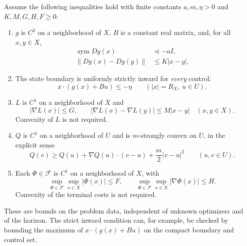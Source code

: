 \documentclass[11pt,a4paper]{article}
\newcommand{\sym}{\operatorname{sym}}
\begin{document}
Assume the following inequalities hold with finite constants
$a,m,\eta>0$ and $K,M,G,H,F\geq0$:
\begin{enumerate}
\item $g$ is $C^2$ on a neighborhood of $X$, $B$ is a constant real
matrix, and, for all $x,y\in X$,
\begin{align}
 \sym Dg(x)&\preceq-aI,\label{eq:drift}\\
 \|Dg(x)-Dg(y)\|&\leq K|x-y|.\label{eq:jaclip}
\end{align}
\item The state boundary is uniformly strictly inward for \emph{every}
control:
\begin{equation}\label{eq:inward}
 x\cdot(g(x)+Bu)\leq-\eta
 \qquad (|x|=R_X,\ u\in U).
\end{equation}
\item $L$ is $C^1$ on a neighborhood of $X$ and
\begin{equation}\label{eq:statecost}
 |\nabla L(x)|\leq G,\qquad
 |\nabla L(x)-\nabla L(y)|\leq M|x-y|
 \quad(x,y\in X).
\end{equation}
Convexity of $L$ is not required.
\item $Q$ is $C^1$ on a neighborhood of $U$ and is $m$-strongly convex
on $U$, in the explicit sense
\begin{equation}\label{eq:strong}
 Q(v)\geq Q(u)+\nabla Q(u)\cdot(v-u)+\frac m2|v-u|^2
 \qquad(u,v\in U).
\end{equation}
\item Each $\Phi\in\mathcal F$ is $C^1$ on a neighborhood of $X$, with
\begin{equation}\label{eq:terminal}
 \sup_{\Phi\in\mathcal F}\sup_{x\in X}|\Phi(x)|\leq F,
 \qquad
 \sup_{\Phi\in\mathcal F}\sup_{x\in X}|\nabla\Phi(x)|\leq H.
\end{equation}
Convexity of the terminal costs is not required.
\end{enumerate}
These are bounds on the problem data, independent of unknown optimizers
and of the horizon. The strict inward condition can, for example, be
checked by bounding the maximum of $x\cdot(g(x)+Bu)$ on the compact
boundary and control set.
\end{document}
